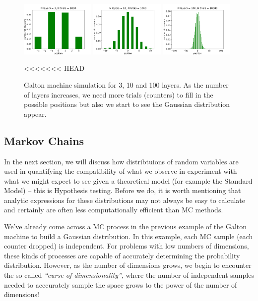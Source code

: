 \begin{figure}[hbt!]
    \centering
    \includegraphics[width=0.32\textwidth]{figures/Probability/layers3.pdf}
    \includegraphics[width=0.32\textwidth]{figures/Probability/layers10.pdf}
    \includegraphics[width=0.32\textwidth]{figures/Probability/layers100.pdf}
    \caption{Galton machine simulation for 3, 10 and 100 layers. As the number of layers increases, we need more trials (counters) to fill in the possible positions but also we start to see the Gaussian distribution appear.}
    \label{fig:simgalton}
<<<<<<< HEAD
\end{figure}

\subsection{Markov Chains}

In the next section, we will discuss how distribtuions of random 
variables are used in quantifying the compatibility of what we observe 
in experiment with what we might expect to see given a theoretical 
model (for example the Standard Model) -- this is Hypothesis testing. 
Before we do, it is worth mentioning that analytic expressions for 
these distributions may not always be easy to calculate and certainly 
are often less computationally efficient than MC methods. 

We've already come across a MC process in the previous 
example of the Galton machine to build a Gaussian distribution. In this 
example, each MC sample (each counter dropped) is independent. For problems 
with low numbers of dimensions, these kinds of processes are 
capable of accurately determining the probability distribution. However, 
as the number of dimensions grows, we begin to encounter the so called 
\emph{``curse of dimensionality''}, where the number of independent 
samples needed to acccurately sample the space grows to the power of 
the number of dimensions!

